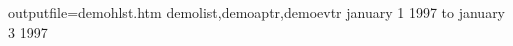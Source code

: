 \documentclass{article}
\begin{document}
\begin{htmllist}
 {outputfile=demohlst.htm}
 {demolist,demoaptr,demoevtr}
 january 1 1997 to january 3 1997
\end{htmllist}
\end{document}
